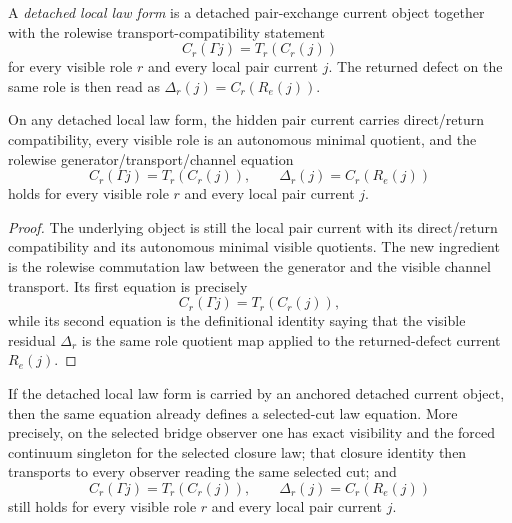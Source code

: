\begin{definition}
\label{def:detached-local-law-form}
A \emph{detached local law form} is a detached pair-exchange current object
together with the rolewise transport-compatibility statement
\[
C_r(\Gamma j)=T_r(C_r(j))
\]
for every visible role \(r\) and every local pair current \(j\). The returned
defect on the same role is then read as \(\Delta_r(j)=C_r(R_e(j))\).
\end{definition}

\begin{theorem}
\label{thm:detached-flagship-law-form}
On any detached local law form, the hidden pair current carries
direct/return compatibility, every visible role is an autonomous minimal
quotient, and the rolewise generator/transport/channel equation
\[
C_r(\Gamma j)=T_r(C_r(j)),
\qquad
\Delta_r(j)=C_r(R_e(j))
\]
holds for every visible role \(r\) and every local pair current \(j\).
\end{theorem}

\begin{proof}
The underlying object is still the local pair current with its direct/return
compatibility and its autonomous minimal visible quotients. The new ingredient
is the rolewise commutation law between the generator and the visible channel
transport. Its first equation is precisely
\[
C_r(\Gamma j)=T_r(C_r(j)),
\]
while its second equation is the definitional identity saying that the visible
residual \(\Delta_r\) is the same role quotient map applied to the returned-defect
current \(R_e(j)\).
\end{proof}

\begin{theorem}
\label{thm:selected-cut-detached-flagship-law}
If the detached local law form is carried by an anchored detached current
object, then the same equation already defines a selected-cut law equation. More
precisely, on the selected bridge observer one has exact visibility and the
forced continuum singleton for the selected closure law; that closure identity
then transports to every observer reading the same selected cut; and
\[
C_r(\Gamma j)=T_r(C_r(j)),
\qquad
\Delta_r(j)=C_r(R_e(j))
\]
still holds for every visible role \(r\) and every local pair current \(j\).
\end{theorem}

